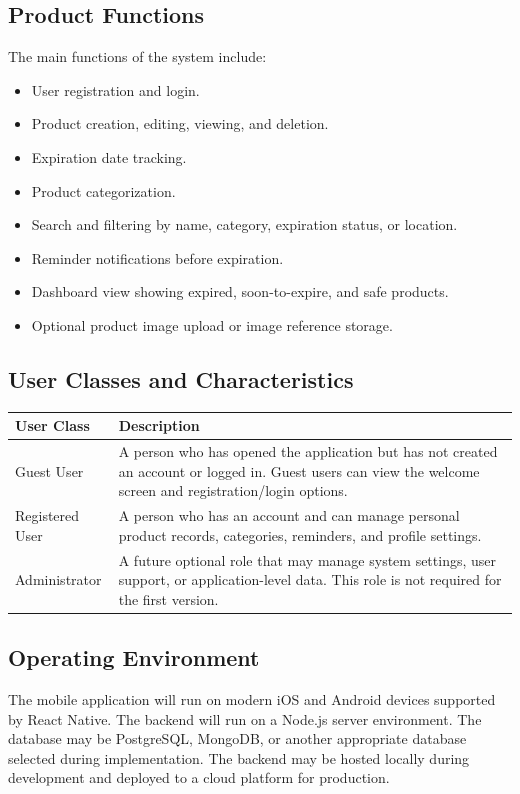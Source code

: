 \documentclass[12pt]{article}
\begin{document}
\subsection{Product Functions}
The main functions of the system include:
\begin{itemize}
    \item User registration and login.
    \item Product creation, editing, viewing, and deletion.
    \item Expiration date tracking.
    \item Product categorization.
    \item Search and filtering by name, category, expiration status, or location.
    \item Reminder notifications before expiration.
    \item Dashboard view showing expired, soon-to-expire, and safe products.
    \item Optional product image upload or image reference storage.
\end{itemize}

\subsection{User Classes and Characteristics}
\begin{longtable}{|p{}|p{}|}
\hline
\textbf{User Class} & \textbf{Description} \\
\hline
Guest User & A person who has opened the application but has not created an account or logged in. Guest users can view the welcome screen and registration/login options. \\
\hline
Registered User & A person who has an account and can manage personal product records, categories, reminders, and profile settings. \\
\hline
Administrator & A future optional role that may manage system settings, user support, or application-level data. This role is not required for the first version. \\
\hline
\end{longtable}

\subsection{Operating Environment}
The mobile application will run on modern iOS and Android devices supported by React Native. The backend will run on a Node.js server environment. The database may be PostgreSQL, MongoDB, or another appropriate database selected during implementation. The backend may be hosted locally during development and deployed to a cloud platform for production.
\end{document}
